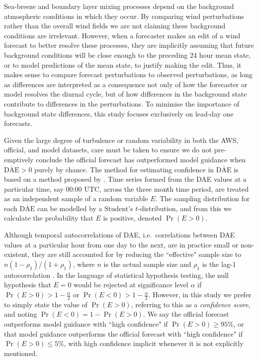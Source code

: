 \documentclass{ametsoc}
\DeclareMathOperator{\pr}{Pr}
\begin{document}
Sea-breeze and boundary layer mixing processes depend on the background atmospheric conditions in which they occur. By comparing wind perturbations rather than the overall wind fields we are not claiming these background conditions are irrelevant. However, when a forecaster makes an edit of a wind forecast to better resolve these processes, they are implicitly assuming that future background conditions will be close enough to the preceding 24 hour mean state, or to model predictions of the mean state, to justify making the edit. Thus, it makes sense to compare forecast perturbations to observed perturbations, as long as differences are interpreted as a consequence not only of how the forecaster or model resolves the diurnal cycle, but of how differences in the background state contribute to differences in the perturbations. To minimise the importance of background state differences, this study focuses exclusively on lead-day one forecasts.

Given the large degree of turbulence or random variability in both the AWS, official, and model datasets, care must be taken to ensure we do not pre-emptively conclude the official forecast has outperformed model guidance when $\overline{\text{DAE}}>0$ purely by chance. The method for estimating confidence in $\overline{\text{DAE}}$ is based on a method proposed by \citet{griffiths17}. Time series formed from the DAE values at a particular time, say 00:00 UTC, across the three month time period, are treated as an independent sample of a random variable $E$. The sampling distribution for each $\overline{\text{DAE}}$ can be modelled by a Student's $t$-distribution, and from this we calculate the probability that $E$ is positive, denoted $\pr\left(E > 0\right)$. 

Although temporal autocorrelations of DAE, i.e.~correlations between DAE values at a particular hour from one day to the next, are in practice small or non-existent, they are still accounted for by reducing the ``effective" sample size to $ n \left(1-\rho_1\right)/\left(1+\rho_1\right)$, where $n$ is the actual sample size and $\rho_1$ is the lag-1 autocorrelation \citep{zwiers95,wilks11}. In the language of statistical hypothesis testing, the null hypothesis that $E=0$ would be rejected at significance level $\alpha$ if $\pr(E>0) > 1-\frac{\alpha}{2}$ or $\pr(E<0) > 1-\frac{\alpha}{2}$. However, in this study we prefer to simply state the value of $\pr(E>0)$, referring to this as a \textit{confidence score}, and noting $\pr(E<0) = 1- \pr(E>0)$. We say the official forecast outperforms model guidance with ``high confidence" if $\pr(E>0) \geq 95\%$, or that model guidance outperforms the  official forecast with ``high confidence" if $\pr(E>0) \leq 5\%$, with high confidence implicit whenever it is not explicitly mentioned.
\end{document}
